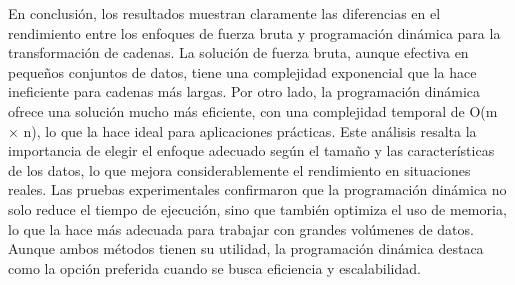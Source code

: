 

En conclusión, los resultados muestran claramente las diferencias en el rendimiento entre los enfoques de fuerza bruta y programación dinámica para la transformación de cadenas. La solución de fuerza bruta, aunque efectiva en pequeños conjuntos de datos, tiene una complejidad exponencial que la hace ineficiente para cadenas más largas. Por otro lado, la programación dinámica ofrece una solución mucho más eficiente, con una complejidad temporal de O(m × n), lo que la hace ideal para aplicaciones prácticas. Este análisis resalta la importancia de elegir el enfoque adecuado según el tamaño y las características de los datos, lo que mejora considerablemente el rendimiento en situaciones reales. Las pruebas experimentales confirmaron que la programación dinámica no solo reduce el tiempo de ejecución, sino que también optimiza el uso de memoria, lo que la hace más adecuada para trabajar con grandes volúmenes de datos. Aunque ambos métodos tienen su utilidad, la programación dinámica destaca como la opción preferida cuando se busca eficiencia y escalabilidad.